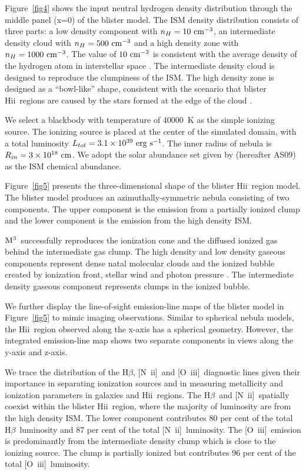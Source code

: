 \documentclass[twocolumn]{aastex62}
\newcommand{\hb}{H$\beta$}    %
\newcommand{\oiii}{[O~{\sc iii}]}
\newcommand{\nii}{[N~{\sc ii}]}
\newcommand{\newcode}{{$\rm M^3$}}
\newcommand{\hiireg}{{H{\sc ii}}}
\begin{document}
\begin{CJK*}{UTF8}{gbsn}
Figure~\ref{fig4} shows the input neutral hydrogen density distribution through the middle panel (x=0) of the blister model.
The ISM density distribution consists of three parts: a low density component with $n_H=10~\rm cm^{-3}$, an intermediate density cloud with $n_H=500~\rm cm^{-3}$ and a high density zone with $n_H=1000~\rm cm^{-3}$. 
The value of $\rm 10~cm^{-3}$ is consistent with the average density of the hydrogen atom in interstellar space \citep{Brinks-1990}.
The intermediate density cloud is designed to reproduce the clumpiness of the ISM.
The high density zone is designed as a ``bowl-like'' shape, consistent with the scenario that blister \hiireg\ regions are caused by the stars formed at the edge of the cloud \citep{Gendelev-2012}.

We select a blackbody with temperature of 40000~K as the simple ionizing source.
The ionizing source is placed at the center of the simulated domain, with a total luminosity $L_{tot}=3.1\times10^{39}~\rm erg~s^{-1}$.
The inner radius of nebula is $R_{in}=3\times10^{18}~\rm cm$.
We adopt the solar abundance set given by \cite{Asplund-2009} (hereafter AS09) as the ISM chemical abundance.

Figure~\ref{fig5} presents the three-dimensional shape of the blister \hiireg\ region model. 
The blister model produces an azimuthally-symmetric nebula consisting of two components. 
The upper component is the emission from a partially ionized clump and the lower component is the emission from the high density ISM. 

\newcode\ successfully reproduces the ionization cone and the diffused ionized gas behind the intermediate gas clump.
The high density and low density gaseous components represent dense natal molecular clouds and the ionized bubble created by ionization front, stellar wind and photon pressure \citep{Gendelev-2012}.
The intermediate density gaseous component represents clumps in the ionized bubble.


We further display the line-of-sight emission-line maps of the blister model in Figure~\ref{fig5} to mimic imaging observations.
Similar to spherical nebula models, the \hiireg\ region observed along the x-axis has a spherical geometry.
However, the integrated emission-line map shows two separate components in views along the y-axis and z-axis.

We trace the distribution of the \hb , \nii\ and \oiii\ diagnostic lines given their importance in separating ionization sources and in measuring metallicity and ionization parameters in galaxies and \hiireg\ regions.
The \hb\ and \nii\ spatially coexist within the blister \hiireg\ region, where the majority of luminosity are from the high density ISM.
The lower component contributes 80 per cent of the total \hb\ luminosity and 87 per cent of the total \nii\ luminosity. 
The \oiii\ emission is predominantly from the intermediate density clump which is close to the ionizing source.
The clump is partially ionized but contributes 96 per cent of the total \oiii\ luminosity.


\end{CJK*}
\end{document}
